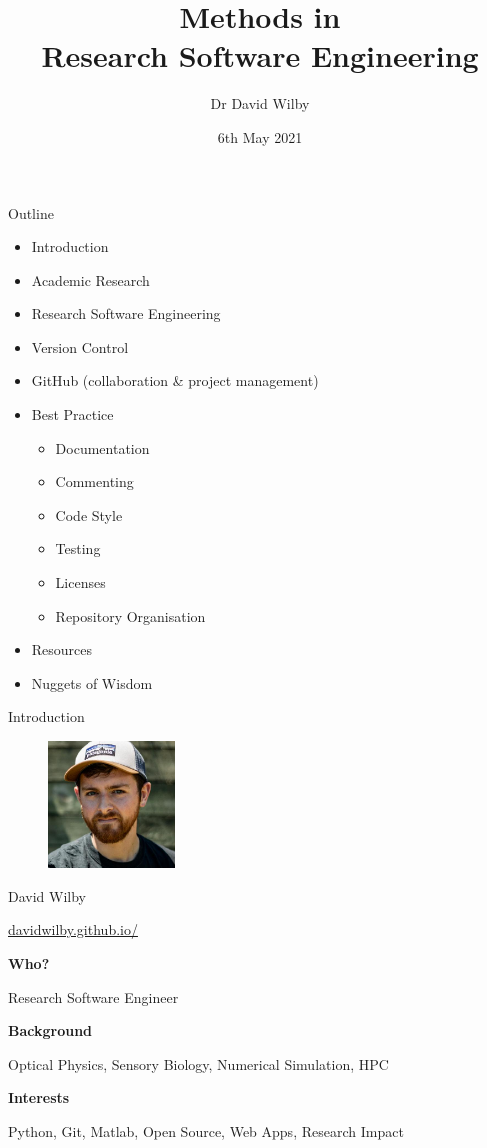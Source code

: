 \documentclass{beamer} %
\title{Methods in \\Research Software Engineering}
\date{6th May 2021}
\author{Dr David Wilby}
\institute{Research Software Engineering Team,\\ The University of Sheffield}
\begin{document}
  \begin{frame}
    \titlepage
  \end{frame}

  \begin{frame}{Outline}
    \begin{itemize}
      \item Introduction
      \item Academic Research
      \item Research Software Engineering
      \item Version Control
      \item GitHub (collaboration \& project management)
      \item Best Practice
      \begin{itemize}
        \item Documentation
        \item Commenting
        \item Code Style
        \item Testing
        \item Licenses
        \item Repository Organisation
      \end{itemize}
      \item Resources
      \item Nuggets of Wisdom
    \end{itemize}
  \end{frame}

  \begin{frame}{Introduction}

    \begin{figure}
        \includegraphics[width=0.3\textwidth]{wilby}
    \end{figure}

    David Wilby

    \href{https://davidwilby.github.io/}{davidwilby.github.io/}

    \textbf{Who?}
    
    Research Software Engineer

    \textbf{Background}

    Optical Physics, Sensory Biology, Numerical Simulation, HPC

    \textbf{Interests}

    Python, Git, Matlab, Open Source, Web Apps, Research Impact

  \end{frame}
\end{document}
